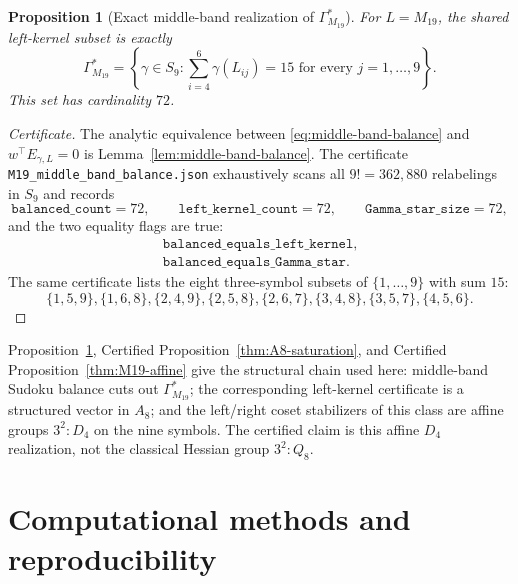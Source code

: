 \documentclass[11pt,a4paper]{article}
\newtheorem{proposition}[theorem]{Proposition}
\theoremstyle{definition}
\theoremstyle{remark}
\newcommand{\GMninetn}{\Gamma^{*}_{M_{19}}}     %
\begin{document}
\begin{proposition}[Exact middle-band realization of $\GMninetn$]
\label{prop:M19-middle-band}
For $L=M_{19}$, the shared left-kernel subset is exactly
\begin{equation*}
   \GMninetn
   =
   \left\{
      \gamma\in S_9:
      \sum_{i=4}^{6}\gamma(L_{ij})=15
      \text{ for every }j=1,\dots,9
   \right\}.
\end{equation*}
This set has cardinality $72$.
\end{proposition}

\begin{proof}[Certificate]
The analytic equivalence between \eqref{eq:middle-band-balance} and
$w^{\top}E_{\gamma,L}=0$ is Lemma~\ref{lem:middle-band-balance}. The
certificate \texttt{M19\_middle\_band\_balance.json} exhaustively scans
all $9! = 362{,}880$ relabelings in $S_9$ and records
\begin{equation*}
   \texttt{balanced\_count}=72,
   \qquad
   \texttt{left\_kernel\_count}=72,
   \qquad
   \texttt{Gamma\_star\_size}=72,
\end{equation*}
and the two equality flags are true:
\begin{equation*}
\begin{gathered}
   \texttt{balanced\_equals\_left\_kernel},\\
   \texttt{balanced\_equals\_Gamma\_star}.
\end{gathered}
\end{equation*}
The same certificate
lists the eight three-symbol subsets of $\{1,\dots,9\}$ with sum $15$:
\begin{equation*}
   \{1,5,9\},
   \{1,6,8\},
   \{2,4,9\},
   \{2,5,8\},
   \{2,6,7\},
   \{3,4,8\},
   \{3,5,7\},
   \{4,5,6\}.
\end{equation*}
\end{proof}

Proposition~\ref{prop:M19-middle-band}, Certified Proposition~\ref{thm:A8-saturation},
and Certified Proposition~\ref{thm:M19-affine} give the structural chain used here:
middle-band Sudoku balance cuts out $\GMninetn$; the corresponding
left-kernel certificate is a structured vector in $A_8$; and the
left/right coset stabilizers of this class are affine groups
$3^2{:}D_4$ on the nine symbols. The
certified claim is this affine $D_4$ realization, not the classical
Hessian group $3^2{:}Q_8$.

\section{Computational methods and reproducibility}\label{sec:methods}
\end{document}
